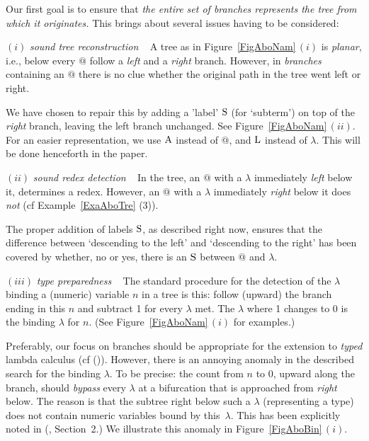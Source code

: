 \documentclass[submission,copyright,creativecommons]{eptcs}
\begin{document}
Our first goal is to ensure that {\em the entire set of branches represents the tree from which it originates.\/} This brings about several issues having to be considered:

\smallskip

$(i)$ {\em sound tree reconstruction\/} ~ A tree as in Figure~\ref{FigAboNam}\,$(i)$ is {\em planar\/}, i.e., below every $@$ follow a {\em left\/}  and a {\em right\/} branch. However, in {\em branches\/} containing an $@$ there is no clue whether the original path in the tree went left or right.

We have chosen to repair this by adding a 'label' ${\rm S}$ (for `subterm') on top of the {\em right\/} branch, leaving the left branch unchanged. See Figure~\ref{FigAboNam}\,$(ii)$. For an easier representation, we use ${\rm A}$ instead of $@$, and ${\rm L}$ instead of $\lambda$. This will be done henceforth in the paper.

\smallskip

$(ii)$ {\em sound redex detection\/} ~ In the tree, an $@$ with a $\lambda$ immediately {\em left\/} below it, determines a redex. However, an $@$ with a $\lambda$ immediately {\em right\/} below it does {\em not\/} (cf Example~\ref{ExaAboTre} (3)).

The proper addition of labels ${\rm S}$, as described right now, ensures that the difference between `descending to the left' and `descending to the right' has been covered by whether, no or yes, there is an ${\rm S}$ between $@$ and $\lambda$.


\smallskip

$(iii)$ {\em type preparedness\/} ~ The standard procedure for the detection of the $\lambda$ binding a (numeric) variable $n$ in a tree is this: follow (upward) the branch ending in this $n$ and subtract 1 for every $\lambda$ met. The $\lambda$ where 1 changes to 0 is the binding $\lambda$ for $n$. (See Figure~\ref{FigAboNam}\,$(i)$ for examples.)

Preferably, our focus on branches should be appropriate for the extension to {\em typed\/} lambda calculus 
(cf (\cite{Bar92})). However, there is an annoying anomaly in the described search for the binding $\lambda$. To be precise: the count from $n$ to 0, upward along the branch, should {\em bypass\/} every $\lambda$ at a bifurcation that is approached from {\em right\/} below. The reason is that the subtree right below such a $\lambda$ (representing a type) does not contain numeric variables bound by this~$\lambda$. This has been explicitly noted in (\cite{deB87}, Section~2.) We illustrate this anomaly in Figure~\ref{FigAboBin}\,$(i)$.
\end{document}
